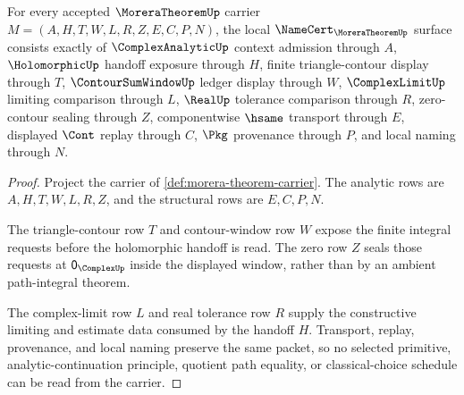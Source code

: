 \begin{theorem}
\label{thm:morera-theorem-namecert-obligations}
For every accepted $\MoreraTheoremUp$ carrier $M=(A,H,T,W,L,R,Z,E,C,P,N)$, the local $\NameCert_{\MoreraTheoremUp}$ surface consists exactly of $\ComplexAnalyticUp$ context admission through $A$, $\HolomorphicUp$ handoff exposure through $H$, finite triangle-contour display through $T$, $\ContourSumWindowUp$ ledger display through $W$, $\ComplexLimitUp$ limiting comparison through $L$, $\RealUp$ tolerance comparison through $R$, zero-contour sealing through $Z$, componentwise $\hsame$ transport through $E$, displayed $\Cont$ replay through $C$, $\Pkg$ provenance through $P$, and local naming through $N$.
\end{theorem}
\begin{proof}
Project the carrier of \autoref{def:morera-theorem-carrier}. The analytic rows are $A,H,T,W,L,R,Z$, and the structural rows are $E,C,P,N$.

The triangle-contour row $T$ and contour-window row $W$ expose the finite integral requests before the holomorphic handoff is read. The zero row $Z$ seals those requests at $\mathsf{0}_{\ComplexUp}$ inside the displayed window, rather than by an ambient path-integral theorem.

The complex-limit row $L$ and real tolerance row $R$ supply the constructive limiting and estimate data consumed by the handoff $H$. Transport, replay, provenance, and local naming preserve the same packet, so no selected primitive, analytic-continuation principle, quotient path equality, or classical-choice schedule can be read from the carrier.
\end{proof}

